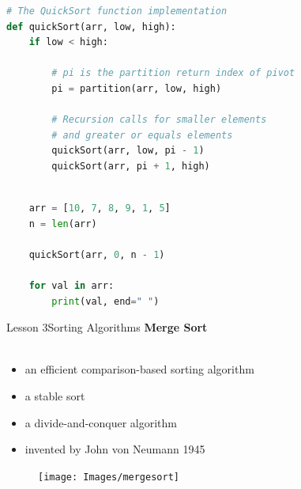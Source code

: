 \documentclass[aspectratio=1610]{beamer}
\begin{document}
\begin{frame}[fragile]
\begin{lstlisting}[language=Python]
# The QuickSort function implementation
def quickSort(arr, low, high):
    if low < high:
        
        # pi is the partition return index of pivot
        pi = partition(arr, low, high)
        
        # Recursion calls for smaller elements
        # and greater or equals elements
        quickSort(arr, low, pi - 1)
        quickSort(arr, pi + 1, high)
\end{lstlisting}
\end{frame}
        
        
\begin{frame}[fragile]
\begin{lstlisting}[language=Python]
	
    arr = [10, 7, 8, 9, 1, 5]
    n = len(arr)

    quickSort(arr, 0, n - 1)
    
    for val in arr:
        print(val, end=" ") 

\end{lstlisting}
\end{frame}






\begin{frame}{Lesson 3}{Sorting Algorithms}
\LARGE
\textbf{Merge Sort}\\~\\
\begin{minipage}{0.65\textwidth}
\Large
\begin{itemize}
    \item an efficient comparison-based sorting algorithm
    \item a stable sort
    \item a divide-and-conquer algorithm 
    \item invented by John von Neumann 1945
\end{itemize}
  \end{minipage}
\begin{minipage}{.0\textwidth}
      \begin{figure}
        \texttt{[image: Images/mergesort]}
      \end{figure}
  \end{minipage}  
\end{frame}
\end{document}
